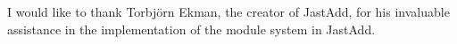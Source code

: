 I would like to thank Torbj\"{o}rn Ekman, the creator of JastAdd, for 
his invaluable assistance in the implementation of the module
system in JastAdd.